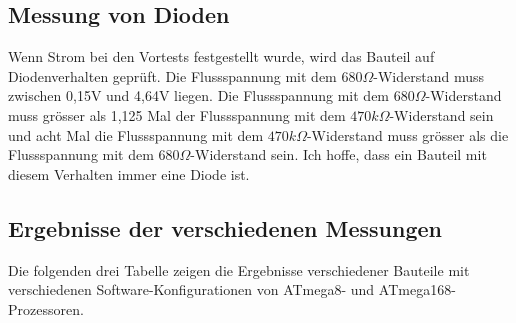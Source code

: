\subsection{Messung von Dioden}
\label{sec:diode}
Wenn Strom bei den Vortests festgestellt wurde, wird das Bauteil auf Diodenverhalten gepr\"uft.
Die Flussspannung mit dem \(680\Omega\)-Widerstand muss zwischen 0,15V und 4,64V liegen.
Die Flussspannung mit dem \(680\Omega\)-Widerstand muss gr\"osser als 1,125 Mal der Flussspannung mit dem
 \(470k\Omega\)-Widerstand sein und acht Mal die Flussspannung mit dem \(470k\Omega\)-Widerstand muss
gr\"osser als die Flussspannung mit dem \(680\Omega\)-Widerstand sein.
Ich hoffe, dass ein Bauteil mit diesem Verhalten immer eine Diode ist.

\subsection{Ergebnisse der verschiedenen Messungen}
Die folgenden drei Tabelle zeigen die Ergebnisse verschiedener Bauteile mit
verschiedenen Software-Konfigurationen von ATmega8- und ATmega168-Prozessoren.

